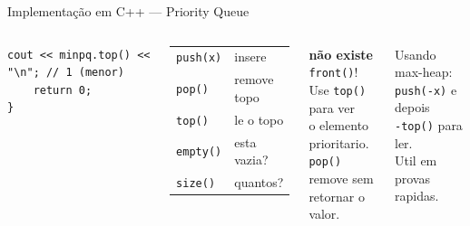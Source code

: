 \documentclass[aspectratio=169,10pt]{beamer}
\begin{document}
\begin{frame}[fragile,shrink=3]{Implementação em C++ --- Priority Queue}
\begin{columns}[t]
\begin{tcolorbox}[caixaCodigo]
\begin{lstlisting}[style=cppstyle]
    cout << minpq.top() << "\n"; // 1 (menor)
    return 0;
}
        \end{lstlisting}
      \end{tcolorbox}
      \begin{tcolorbox}[caixaRoxa,title={Operacoes PQ}]
        \footnotesize
        \begin{tabular}{@{}ll@{}}
          \texttt{push(x)}  & insere\\[2pt]
          \texttt{pop()}    & remove topo\\[2pt]
          \texttt{top()}    & le o topo\\[2pt]
          \texttt{empty()}  & esta vazia?\\[2pt]
          \texttt{size()}   & quantos?\\
        \end{tabular}
      \end{tcolorbox}
      \vspace{0.08cm}
      \begin{tcolorbox}[caixaVermelho,title={Atenção}]
        \footnotesize
        \textbf{não existe} \texttt{front()}!\\[2pt]
        Use \texttt{top()} para ver\\
        o elemento prioritario.\\[2pt]
        \texttt{pop()} remove sem\\retornar o valor.
      \end{tcolorbox}
      \vspace{0.08cm}
      \begin{tcolorbox}[caixaVerde,title={Min-heap rapido}]
        \footnotesize
        Usando max-heap:\\
        \texttt{push(-x)} e depois\\
        \texttt{-top()} para ler.\\[2pt]
        Util em provas rapidas.
      \end{tcolorbox}
  \end{columns}
\end{frame}
\end{document}

